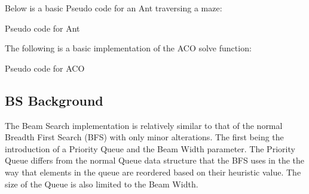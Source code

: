 \documentclass[conference]{IEEEtran}
\begin{document}
        Below is a basic Pseudo code for an Ant traversing a maze:
        
        \begin{algorithm}[H]
            \caption{Pseudo code for Ant}
            \SetAlgoLined
        \end{algorithm}
        The following is a basic implementation of the ACO solve function:
        \begin{algorithm}[h]
            \caption{Pseudo code for ACO}
            \SetAlgoLined
        \end{algorithm}
    \subsection{BS Background}
        The Beam Search implementation is relatively similar to that of the normal Breadth First Search (BFS) with only minor alterations. The first being the introduction of a Priority Queue and the Beam Width parameter. The Priority Queue differs from the normal Queue data structure that the BFS uses in the the way that elements in the queue are reordered based on their heuristic value. The size of the Queue is also limited to the Beam Width.  
        
\end{document}
